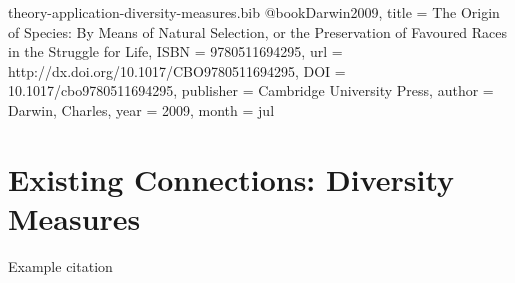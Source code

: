 \begin{bibunit}

\begin{filecontents*}[overwrite]{theory-application-diversity-measures.bib}
@book{Darwin2009,
  title = {The Origin of Species: By Means of Natural Selection,  or the Preservation of Favoured Races in the Struggle for Life},
  ISBN = {9780511694295},
  url = {http://dx.doi.org/10.1017/CBO9780511694295},
  DOI = {10.1017/cbo9780511694295},
  publisher = {Cambridge University Press},
  author = {Darwin,  Charles},
  year = {2009},
  month = jul 
}
\end{filecontents*} 

\section{Existing Connections: Diversity Measures}
\label{sec:diversity-measures}

Example citation \citep{Darwin2009}

    
\end{bibunit}
